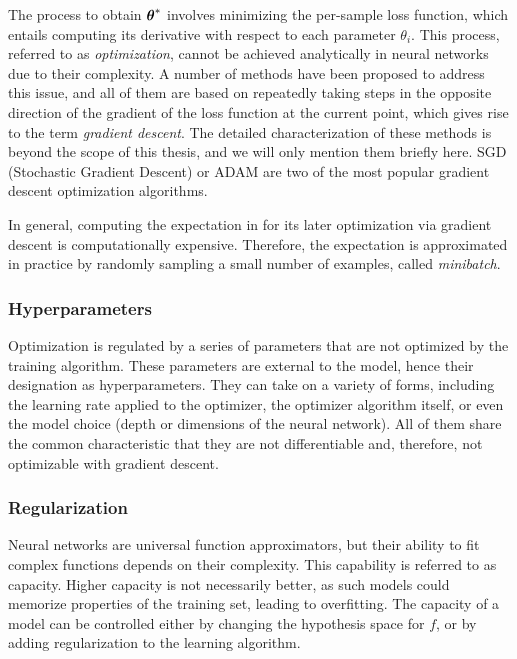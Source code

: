 The process to obtain $\boldsymbol{\theta}^*$ involves minimizing the per-sample loss function, which entails computing its derivative with respect to each parameter $\theta_i$. This process, referred to as \textit{optimization}, cannot be achieved analytically in neural networks due to their complexity. A number of methods have been proposed to address this issue, and all of them are based on repeatedly taking steps in the opposite direction of the gradient of the loss function at the current point, which gives rise to the term \textit{gradient descent}. The detailed characterization of these methods is beyond the scope of this thesis, and we will only mention them briefly here. SGD (Stochastic Gradient Descent) or ADAM are two of the most popular gradient descent optimization algorithms.

In general, computing the expectation in  for its later optimization via gradient descent is computationally expensive. Therefore, the expectation is approximated in practice by randomly sampling a small number of examples, called \textit{minibatch}. 

\subsubsection{Hyperparameters}
Optimization is regulated by a series of parameters that are not optimized by the training algorithm. These parameters are external to the model, hence their designation as hyperparameters. They can take on a variety of forms, including the learning rate applied to the optimizer, the optimizer algorithm itself, or even the model choice (depth or dimensions of the neural network). All of them share the common characteristic that they are not differentiable and, therefore, not optimizable with gradient descent.

\subsubsection{Regularization}
Neural networks are universal function approximators, but their ability to fit complex functions depends on their complexity. This capability is referred to as capacity. Higher capacity is not necessarily better, as such models could memorize properties of the training set, leading to overfitting. The capacity of a model can be controlled either by changing the hypothesis space for $f$, or by adding regularization to the learning algorithm.

